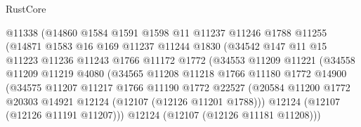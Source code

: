 \begin{lexlean}{RustCore}
\begin{coremodule}
                            @11338
                            (@14860
                              @1584
                              @1591
                              @1598
                              @11
                              @11237
                              @11246
                              @1788
                              @11255
                              (@14871
                                @1583
                                @16
                                @169
                                @11237
                                @11244
                                @1830
                                (@34542
                                  @147
                                  @11
                                  @15
                                  @11223
                                  @11236
                                  @11243
                                  @1766
                                  @11172
                                  @1772
                                  (@34553
                                    @11209
                                    @11221
                                    (@34558
                                      @11209
                                      @11219
                                      @4080
                                      (@34565
                                        @11208
                                        @11218
                                        @1766
                                        @11180
                                        @1772
                                        @14900
                                        (@34575
                                          @11207
                                          @11217
                                          @1766
                                          @11190
                                          @1772
                                          @22527
                                          (@20584
                                            @11200
                                            @1772
                                            @20303
                                            @14921
                                            @12124
                                            (@12107 (@12126 @11201 @1788)))
                                          @12124
                                          (@12107 (@12126 @11191 @11207)))
                                        @12124
                                        (@12107 (@12126 @11181 @11208)))

\end{coremodule}
\end{lexlean}
